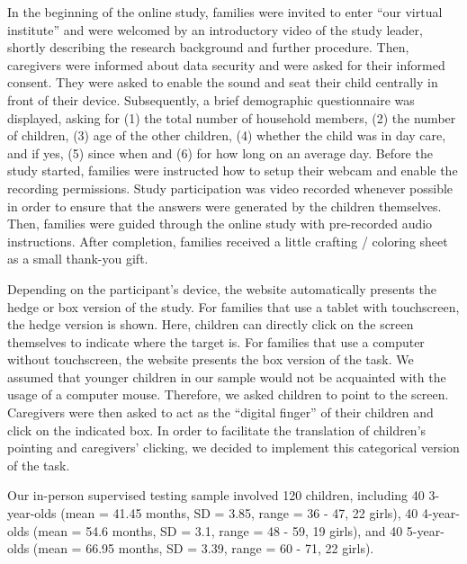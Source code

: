 \documentclass[
  english,
  man,floatsintext]{apa6}
\begin{document}
In the beginning of the online study, families were invited to enter ``our virtual institute'' and were welcomed by an introductory video of the study leader, shortly describing the research background and further procedure. Then, caregivers were informed about data security and were asked for their informed consent. They were asked to enable the sound and seat their child centrally in front of their device. Subsequently, a brief demographic questionnaire was displayed, asking for (1) the total number of household members, (2) the number of children, (3) age of the other children, (4) whether the child was in day care, and if yes, (5) since when and (6) for how long on an average day. Before the study started, families were instructed how to setup their webcam and enable the recording permissions. Study participation was video recorded whenever possible in order to ensure that the answers were generated by the children themselves.
Then, families were guided through the online study with pre-recorded audio instructions. After completion, families received a little crafting / coloring sheet as a small thank-you gift.

Depending on the participant's device, the website automatically presents the hedge or box version of the study. For families that use a tablet with touchscreen, the hedge version is shown. Here, children can directly click on the screen themselves to indicate where the target is. For families that use a computer without touchscreen, the website presents the box version of the task. We assumed that younger children in our sample would not be acquainted with the usage of a computer mouse. Therefore, we asked children to point to the screen. Caregivers were then asked to act as the ``digital finger'' of their children and click on the indicated box. In order to facilitate the translation of children's pointing and caregivers' clicking, we decided to implement this categorical version of the task.

Our in-person supervised testing sample involved 120 children, including 40 3-year-olds (mean = 41.45 months, SD = 3.85, range = 36 - 47, 22 girls), 40 4-year-olds (mean = 54.6 months, SD = 3.1, range = 48 - 59, 19 girls), and 40 5-year-olds (mean = 66.95 months, SD = 3.39, range = 60 - 71, 22 girls).
\end{document}
